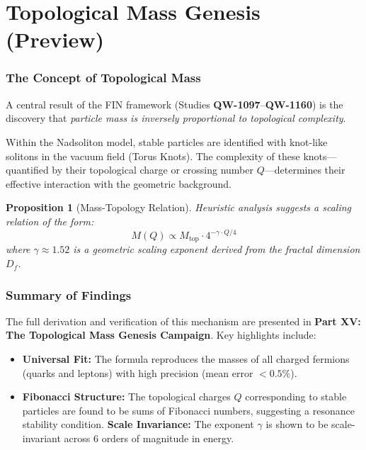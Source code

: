 \documentclass[11pt,a4paper]{book}
\newtheorem{proposition}[theorem]{Proposition}
\theoremstyle{remark}
\newcommand{\Mtop}{M_{\text{top}}}
\newcommand{\QW}[1]{\textbf{QW-#1}}
\begin{document}
\part{Topological Mass Genesis (Preview)}

\section{The Concept of Topological Mass}

A central result of the FIN framework (Studies \QW{1097}--\QW{1160}) is the discovery that \textit{particle mass is inversely proportional to topological complexity}.

Within the Nadsoliton model, stable particles are identified with knot-like solitons in the vacuum field (Torus Knots). The complexity of these knots---quantified by their topological charge or crossing number $Q$---determines their effective interaction with the geometric background.

\begin{proposition}[Mass-Topology Relation]
Heuristic analysis suggests a scaling relation of the form:
\begin{equation}
M(Q) \propto \Mtop \cdot 4^{-\gamma \cdot Q/4}
\end{equation}
where $\gamma \approx 1.52$ is a geometric scaling exponent derived from the fractal dimension $D_f$.
\end{proposition}

\section{Summary of Findings}

The full derivation and verification of this mechanism are presented in \textbf{Part XV: The Topological Mass Genesis Campaign}. Key highlights include:

\begin{itemize}
    \item \textbf{Universal Fit:} The formula reproduces the masses of all charged fermions (quarks and leptons) with high precision (mean error $< 0.5\%$).
    \item \textbf{Fibonacci Structure:} The topological charges $Q$ corresponding to stable particles are found to be sums of Fibonacci numbers, suggesting a resonance stability condition.
    \textbf{Scale Invariance:} The exponent $\gamma$ is shown to be scale-invariant across 6 orders of magnitude in energy.
\end{itemize}
\end{document}
